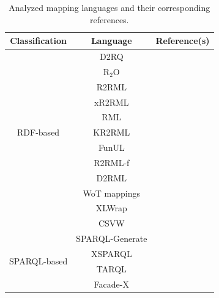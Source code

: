 \begin{table}[t]
\caption[Mapping languages overview]{Analyzed mapping languages and their corresponding references. }
\label{tab:chp2_languages_summary}
\begin{tabular}{c|c|c}
\hline
Classification                 & Language        & Reference(s) \\ \hline
\multirow{11}{*}{RDF-based}   & D2RQ            & \cite{bizer2004d2rq,d2rq}\\ \cline{2-3} 
                              & R$_2$O          & \cite{barrasa2004r2o}\\ \cline{2-3} 
                              & R2RML           & \cite{das2012r2rml}\\ \cline{2-3} 
                              & xR2RML          & \cite{michel2015xr2rml,xr2rml}\\ \cline{2-3} 
                              & RML             & \cite{Dimou2014rml,rml}\\ \cline{2-3} 
                              & KR2RML          & \cite{slepicka2015kr2rml}\\ \cline{2-3} 
                              & FunUL           & \cite{junior2016funul}\\ \cline{2-3} 
                              & R2RML-f         & \cite{debruyne2016r2rmlf}\\ \cline{2-3} 
                              & D2RML           & \cite{chortaras2018d2rml}\\ \cline{2-3}  
                              & WoT mappings    & \cite{cimmino2020ewot}\\ \cline{2-3} 
                              & XLWrap          & \cite{langegger2009xlwrap,xlwrap}\\ \cline{2-3} 
                              & CSVW            & \cite{Tennison2015csvw}\\ \hline
\multirow{4}{*}{SPARQL-based} & SPARQL-Generate &     
                              \cite{Lefrancois2017sparqlgenerate,sparqlgenerate}\\ \cline{2-3} 
                              & XSPARQL         & \cite{Bischof2012xsparql,xsparql}\\ \cline{2-3} 
                              & TARQL           & \cite{tarql}\\ \cline{2-3}
                              & Facade-X        & \cite{asprino2023sparql-anything,sparqlanything}\\ \cline{2-3}

\end{tabular}
\end{table}
